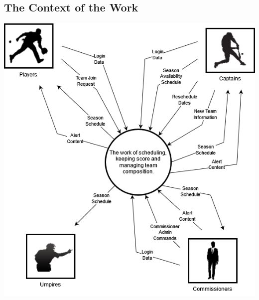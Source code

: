 \documentclass[12pt]{article}
\begin{document}
\subsection{The Context of the Work}
\includegraphics[scale=0.6]{6b_context_diagram.png}
\end{document}
